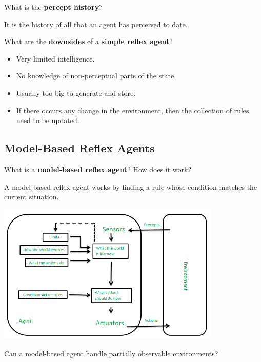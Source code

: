 \begin{cstqsn*}
What is the \textbf{percept history}?
\end{cstqsn*}

It is the history of all that an agent has perceived to date.

\begin{cstqsn*}
What are the \textbf{downsides} of a \textbf{simple reflex agent}?
\end{cstqsn*}

\begin{itemize}
  \item Very limited intelligence.
  \item No knowledge of non-perceptual parts of the state.
  \item Usually too big to generate and store.
  \item If there occurs any change in the environment, then the collection of
    rules need to be updated.
\end{itemize}

\subsection{Model-Based Reflex Agents}

\begin{cstqsn*}
What is a \textbf{model-based reflex agent}? How does it work?
\end{cstqsn*}

A model-based reflex agent works by finding a rule whose condition matches the
current situation.

\begin{center} 
  \includegraphics[width=0.8\textwidth]{images/lec01/model-based_reflex_agent.png}
\end{center}

\begin{cstqsn*}
Can a model-based agent handle partially observable environments?
\end{cstqsn*}

